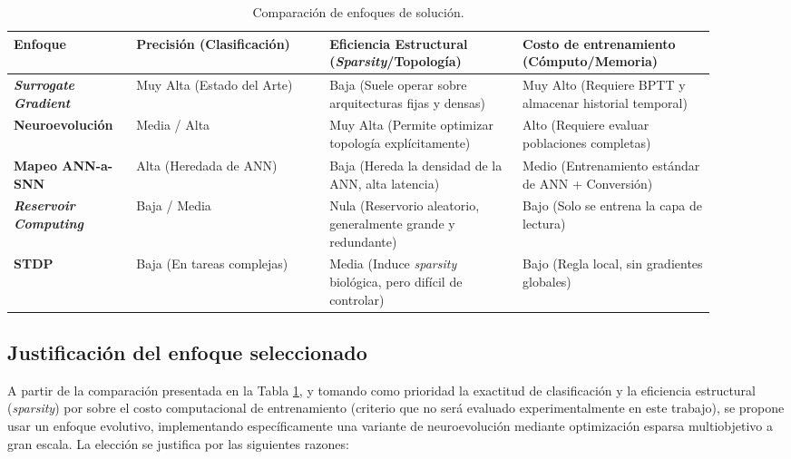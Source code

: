 \begin{table}[h]
    \centering
    \small
\caption{Comparación de enfoques de solución.}
\label{tab:enfoques-comp}
    \begin{tabular}{>{\centering\arraybackslash}p{0.15\linewidth}>{\centering\arraybackslash}p{0.25\linewidth}>{\centering\arraybackslash}p{0.25\linewidth}>{\centering\arraybackslash}p{0.25\linewidth}}\toprule
         \textbf{Enfoque}&  \textbf{Precisión (Clasificación)}& \textbf{Eficiencia Estructural (\textit{Sparsity}/Topología)}& \textbf{ Costo de entrenamiento (Cómputo/Memoria)}\\\midrule
         \textbf{\textit{Surrogate Gradient}}&  Muy Alta (Estado del Arte)& Baja (Suele operar sobre arquitecturas fijas y densas)&  Muy Alto (Requiere BPTT y almacenar historial temporal)\\
         \textbf{Neuroevolución}&  Media / Alta& Muy Alta (Permite optimizar topología explícitamente)&  Alto (Requiere evaluar poblaciones completas)\\
        \textbf{ Mapeo ANN-a-SNN}&  Alta (Heredada de ANN)& Baja (Hereda la densidad de la ANN, alta latencia)&  Medio (Entrenamiento estándar de ANN + Conversión)\\
         \textbf{\textit{Reservoir Computing}}&  Baja / Media& Nula (Reservorio aleatorio, generalmente grande y redundante)&  Bajo (Solo se entrena la capa de lectura)\\
         \textbf{STDP}&  Baja (En tareas complejas)& Media (Induce \textit{sparsity} biológica, pero difícil de controlar)&  Bajo (Regla local, sin gradientes globales)\\\bottomrule
    \end{tabular}
\end{table}

\subsection{Justificación del enfoque seleccionado}
A partir de la comparación presentada en la Tabla \ref{tab:enfoques-comp}, y tomando como prioridad la exactitud de clasificación y la eficiencia estructural (\textit{sparsity}) por sobre el costo computacional de entrenamiento (criterio que no será evaluado experimentalmente en este trabajo), se propone usar un enfoque evolutivo, implementando específicamente una variante de neuroevolución mediante optimización esparsa multiobjetivo a gran escala. La elección se justifica por las siguientes razones:

